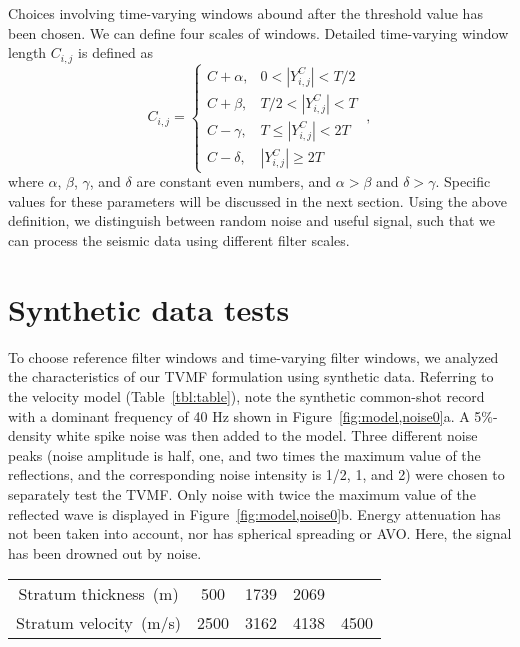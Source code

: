 Choices involving time-varying windows abound after the threshold value has been 
chosen. We can define four scales of windows. Detailed time-varying 
window length $C_{i,j}$ is defined as 
        \begin{equation}
        \label{eq:eq4}
          C_{i,j} = \left \{ \begin{array}{ll}
                    C+\alpha, & \textrm{$0<|Y_{i,j}^C|<T/2$} \\
                    C+\beta, & \textrm{$T/2<|Y_{i,j}^C|<T$} \\
                    C-\gamma, & \textrm{$T \le |Y_{i,j}^C| <2T$}\\
                    C-\delta, & \textrm{$|Y_{i,j}^C| \ge 2T$}
                  \end{array} \right.\;,
      \end{equation}
where $\alpha$, $\beta$, $\gamma$, and $\delta$ are constant even numbers, and 
$\alpha>\beta$ and $\delta>\gamma$. Specific values for these 
parameters will be discussed in the next section. Using 
the above definition, we distinguish between random noise 
and useful signal, such that we can process 
the seismic data using different filter scales.

 \section{Synthetic data tests}

To choose reference filter windows and time-varying filter windows, we analyzed the 
characteristics of our TVMF formulation using synthetic data. Referring to the 
velocity model (Table~\ref{tbl:table}), note the synthetic common-shot record with 
a dominant frequency of 40 Hz shown in Figure~\ref{fig:model,noise0}a. A 5\%-density 
white spike noise was then added to the model. Three different noise peaks (noise amplitude is half, one, 
and two times the maximum value of the reflections, and the corresponding noise 
intensity is 1/2, 1, and 2) were chosen to separately test the TVMF. Only noise with twice the 
maximum value of the reflected wave is displayed in Figure~\ref{fig:model,noise0}b. Energy 
attenuation has not been taken into account, nor has spherical spreading or AVO. 
Here, the signal has been drowned out by noise.

    {
      \begin{center}
        \begin{tabular}{ccccc}
          \hline
          Stratum thickness~(m)  & 500  & 1739 & 2069 &  \\
          Stratum velocity~(m/s) & 2500 & 3162 & 4138 & 4500 \\
          \hline
        \end{tabular}
      \end{center}
      }

